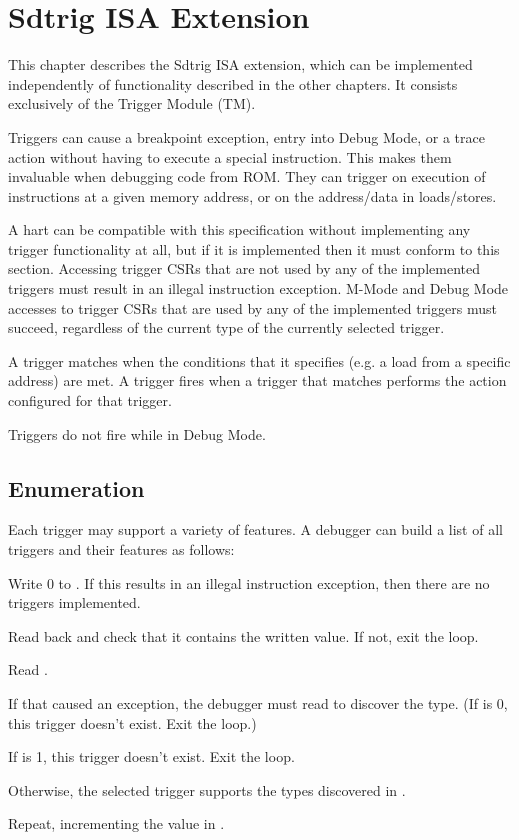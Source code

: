 \chapter{Sdtrig ISA Extension}
\label{sec:trigger}

This chapter describes the Sdtrig ISA extension, which can be implemented
independently of functionality described in the other chapters. It consists
exclusively of the Trigger Module (TM).

Triggers can cause a breakpoint exception, entry into Debug Mode, or a trace action
without having to execute a special instruction. This makes them invaluable
when debugging code from ROM. They can trigger on execution of instructions at
a given memory address, or on the address/data in loads/stores.

A hart can be compatible with this specification without implementing any
trigger functionality at all, but if it is implemented then it must conform to
this section.
Accessing trigger CSRs that are not used by any of the implemented triggers must
result in an illegal instruction exception. M-Mode and Debug Mode accesses to
trigger CSRs that are used by any of the implemented triggers must succeed,
regardless of the current type of the currently selected trigger.

A trigger matches when the conditions that it specifies (e.g. a load from a
specific address) are met. A trigger fires when a trigger that matches performs
the action configured for that trigger.

Triggers do not fire while in Debug Mode.

\section{Enumeration}

\begin{steps}{Each trigger may support a variety of features. A debugger can
    build a list of all triggers and their features as follows:}
\item Write 0 to \RcsrTselect. If this results in an illegal instruction
    exception, then there are no triggers implemented.
\item Read back \RcsrTselect and check that it contains the written value. If not,
    exit the loop.
\item Read \RcsrTinfo.
\item If that caused an exception, the debugger must read \RcsrTdataOne to
    discover the type. (If \FcsrTdataOneType is 0, this trigger doesn't exist. Exit the
    loop.)
\item If \FcsrTinfoInfo is 1, this trigger doesn't exist. Exit the loop.
\item Otherwise, the selected trigger supports the types discovered in \FcsrTinfoInfo.
\item Repeat, incrementing the value in \RcsrTselect.
\end{steps}

